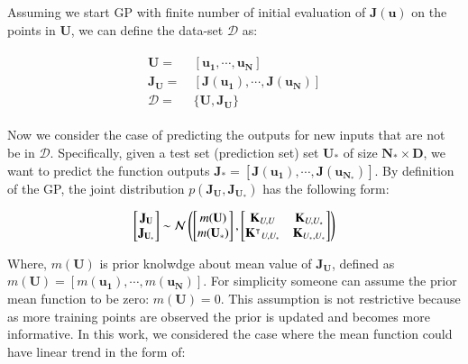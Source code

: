 \documentclass[]{elsarticle} %
\begin{document}
Assuming we start GP with finite number of initial evaluation of \(\mathbf{J(u)}\) on the points in \(\mathbf{U}\), we can define the data-set \(\mathcal{D}\) as:

\begin{align}
  \begin{split}
\mathbf{U}= & \: [\mathbf{u_1},\cdots,\mathbf{u_N}] \\
\mathbf{J_U}= & \: [\mathbf{J(u_1)},\cdots,\mathbf{J(u_N)}] \\
\mathcal{D}= & \: \{\mathbf{U},\mathbf{\mathbf{J_U}}\}
  \end{split}
\label{eq:init-data}
\end{align}

Now we consider the case of predicting the outputs for new inputs that are not be in \(\mathcal{D}\). Specifically, given a test set (prediction set) set \(\mathbf{U_*}\) of size \(\mathbf{N_* \times D}\), we want to predict the function outputs \(\mathbf{J_*} = [\mathbf{J(u_1)},\cdots, \mathbf{J(u_{N_*})}]\). By definition of the GP, the joint distribution \(p(\mathbf{J_U}, \mathbf{J_{U_*}})\) has the following form:

\begin{equation}
\begin{bmatrix}  {\bf {J_U}}  \\  {\mathbf{J_{U_*}}} \end{bmatrix} \sim \mathcal{N} \begin{pmatrix} \begin{bmatrix}  {m(\mathbf{U})}  \\  {m(\mathbf{U_*})} \end{bmatrix},\begin{bmatrix} {{\bf K}_{U,U}}  & {{\bf
K}_{U,U_*}}  \\  {{\bf \mathbf{K}^\intercal}_{U,U_*}} & {{\bf K}_{U_*,U_*} } \end{bmatrix}\end{pmatrix}
\label{eq:gp-model-mat}
\end{equation}

Where, \(m(\mathbf{U})\) is prior knolwdge about mean value of \(\mathbf{J_U}\), defined as \(m(\mathbf{U})=[m(\mathbf{u_1}),\cdots,m(\mathbf{u_N})]\). For simplicity someone can assume the prior mean function to be zero: \(m(\mathbf{U}) = 0\). This assumption is not restrictive because as more training points are observed the prior is updated and becomes more informative. In this work, we considered the case where the mean function could have linear trend in the form of:
\end{document}

